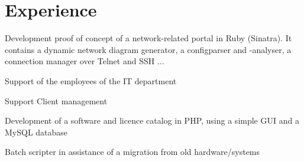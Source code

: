 \documentclass[a4paper]{deedy-resume} %
\begin{document}
\hfill
%
%
\begin{minipage}[t]{0.60\textwidth} %


\section{Experience}


\vspace{\topsep} %
\begin{tightitemize}
\item Development proof of concept of a network-related portal in Ruby (Sinatra). It contains a dynamic network diagram generator, a configparser and -analyser, a connection manager over Telnet and SSH ...
\end{tightitemize}

\sectionspace %



\begin{tightitemize}
\item Support of the employees of the IT department
\item Support Client management
\item Development of a software and licence catalog in PHP, using a simple GUI and a MySQL database
\item Batch scripter in assistance of a migration from old hardware/systems
\end{tightitemize}

\sectionspace %




\end{minipage}
\end{document}
